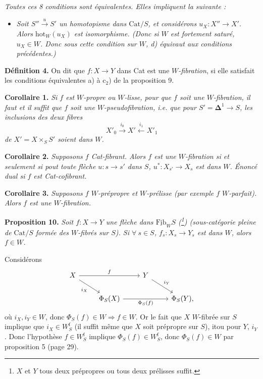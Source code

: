 \documentclass[11pt]{article}
\newcommand{\printedpage}[1]{\marginpar{\footnotesize p.~#1}}
\newcommand{\msp}[1]{\marginpar{\footnotesize [#1]}}
\newcommand{\hot}{\mathrm{hot}}
\newcommand{\Wf}{W^{\mathrm{f}}_S}
\begin{document}
\textit{Toutes ces 8 conditions sont équivalentes. Elles impliquent la suivante :}

\begin{itemize}[leftmargin=4em]
\item[\textit{d)}] \textit{Soit $S'' \xrightarrow{u} S'$ un homotopisme dans $\mathrm{Cat}/S$, et considérons $u_X : X'' \longrightarrow X'$. Alors $\hot_W(u_X)$ est isomorphisme. (Donc si $W$ est fortement saturé, $u_X \in W$. Donc sous cette condition sur $W$, d) équivaut aux conditions précédentes.)}
\end{itemize}

\msp{page 52}
\textbf{Définition 4.} On dit que $f : X \longrightarrow Y$ dans Cat est une \textit{$W$-fibration}, si elle satisfait les conditions équivalentes a) à c$_2$) de la proposition 9.

\textbf{Corollaire 1.} \textit{Si $f$ est $W$-propre ou $W$-lisse, pour que $f$ soit une $W$-fibration, il faut et il suffit que $f$ soit une $W$-pseudofibration, i.e. que pour $S' = \mathbf{\Delta}^1 \longrightarrow S$, les inclusions des deux fibres}
\[ X'_0 \xrightarrow{i_0} X' \xleftarrow{i_1} X'_1 \]
\textit{de $X' = X \times_S S'$ soient dans $W$.}

\textbf{Corollaire 2.} \textit{Supposons $f$ \textup{Cat}-fibrant. Alors $f$ est une $W$-fibration si et seulement si pout toute flèche $u : s \longrightarrow s'$ dans $S$, $u^* : X_{s'} \longrightarrow X_s$ est dans $W$. Énoncé dual si $f$ est \textup{Cat}-cofibrant.} %

\textbf{Corollaire 3.} \textit{Supposons $f$ $W$-prépropre et $W$-prélisse (par exemple $f$ $W$-parfait). Alors $f$ est une $W$-fibration.}

\textbf{Proposition 10.} \textit{Soit $f : X \longrightarrow Y$ une flèche dans $\underline{\mathrm{Fib}}_WS$ (\footnote[59]{$X$ et $Y$ tous deux prépropres ou tous deux prélisses suffit.}) (sous-catégorie pleine de $\mathrm{Cat}/S$ formée des $W$-fibrés sur $S$). Si $\forall\ s \in S$, $f_s : X_s \longrightarrow Y_s$ est dans $W$, alors $f \in W$.}

Considérons
\printedpage{38}
\[ \begin{tikzcd}
X \arrow[rr, "f"] \arrow[dr, "i_X"'] & & Y \arrow[dr, "i_Y"] & \\
 & \Phi_S(X) \arrow[rr, "\Phi_S(f)"'] & & \Phi_S(Y),
\end{tikzcd} \]
où $i_X, i_Y \in W$, donc $\Phi_S(f) \in W \Rightarrow f \in W$. Or le fait que $X$ $W$-fibrée sur $S$ implique que $i_X \in \Wf$ (il suffit même que $X$ soit prépropre sur $S$), itou pour $Y$, $i_Y$. Donc l'hypothèse $f \in \Wf$ implique $\Phi_S(f) \in \Wf$, donc $\Phi_S(f) \in W$ par proposition 5 (page 29).
\end{document}
